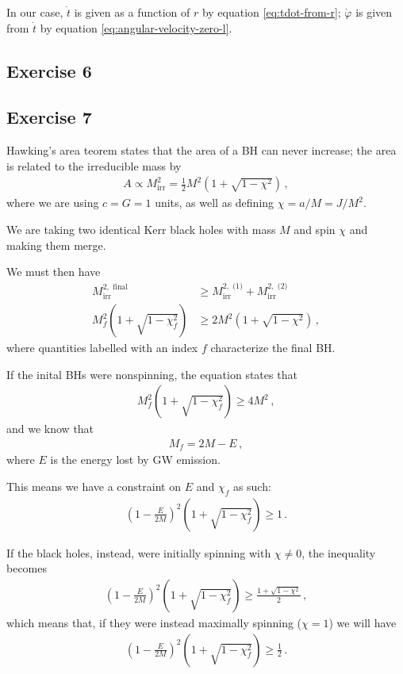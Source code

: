 \documentclass[main.tex]{subfiles}
\begin{document}
In our case, \(\dot{t}\) is given as a function of \(r\) by equation \eqref{eq:tdot-from-r}; \(\dot{\varphi}\) is given from \(\dot{t}\) by equation \eqref{eq:angular-velocity-zero-l}. 


\subsection{Exercise 6}
\subsection{Exercise 7}

Hawking's area teorem states that the area of a BH can never increase; the area is related to the irreducible mass by 
%
\begin{align}
A \propto M _{\text{irr}}^2 = \frac{1}{2} M^2\left(1 + \sqrt{1 - \chi^2}\right)
\,,
\end{align}
%
where we are using \(c = G = 1\) units, as well as defining \(\chi = a / M = J / M^2\).  

We are taking two identical Kerr black holes with mass \(M\) and spin \(\chi\) and making them merge. 

We must then have %
\begin{align}
M_{\text{irr}}^{2, \text{ final}} &\geq 
M^{2, \text{ (1)}} _{\text{irr}}  +
M^{2, \text{ (2)}} _{\text{irr}}  
\\
M_f^2 \left( 1+ \sqrt{1 - \chi _f^2}\right) &\geq 2 M^2\left(1 + \sqrt{1 - \chi^2}\right)
\,,
\end{align}
%
where quantities labelled with an index \(f\) characterize the final BH. 

If the inital BHs were nonspinning, the equation states that %
\begin{align}
M_f^2 \left(1 + \sqrt{1 - \chi _f^2}\right) \geq 4 M^2
\,,
\end{align}
%
and we know that %
\begin{align}
M_f = 2M - E
\,,
\end{align}
%
where \(E\) is the energy lost by GW emission. 

This means we have a constraint on \(E\) and \(\chi _f\) as such: %
\begin{align}
\left(1 - \frac{E}{2M}\right)^2 \left(1 + \sqrt{1 - \chi _f^2}\right) \geq 1
\,.
\end{align}

If the black holes, instead, were initially spinning with \(\chi \neq 0\), the inequality becomes %
\begin{align}
\left(1 - \frac{E}{2M}\right)^2 \left(1 + \sqrt{1 - \chi _f^2}\right) \geq \frac{1 + \sqrt{1 - \chi^2}}{2}
\,,
\end{align}
%
which means that, if they were instead maximally spinning (\(\chi = 1\)) we will have 
%
\begin{align}
\left(1 - \frac{E}{2M}\right)^2 \left(1 + \sqrt{1 - \chi _f^2}\right) \geq \frac{1}{2}
\,.
\end{align}
\end{document}
